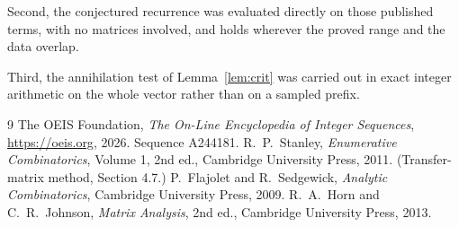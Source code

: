 \documentclass[11pt,a4paper]{article}
\theoremstyle{plain}
\theoremstyle{definition}
\begin{document}
Second, the conjectured recurrence was evaluated directly on those published terms, with no
matrices involved, and holds wherever the proved range and the data overlap.

Third, the annihilation test of Lemma~\ref{lem:crit} was carried out in exact integer
arithmetic on the whole vector rather than on a sampled prefix.

\begin{thebibliography}{9}
 The OEIS Foundation, \emph{The On-Line Encyclopedia of Integer
Sequences}, \url{https://oeis.org}, 2026. Sequence A244181.
 R.~P.~Stanley, \emph{Enumerative Combinatorics}, Volume 1, 2nd ed.,
Cambridge University Press, 2011. (Transfer-matrix method, Section 4.7.)
 P.~Flajolet and R.~Sedgewick, \emph{Analytic Combinatorics}, Cambridge
University Press, 2009.
 R.~A.~Horn and C.~R.~Johnson, \emph{Matrix Analysis}, 2nd ed., Cambridge
University Press, 2013.
\end{thebibliography}
\end{document}
